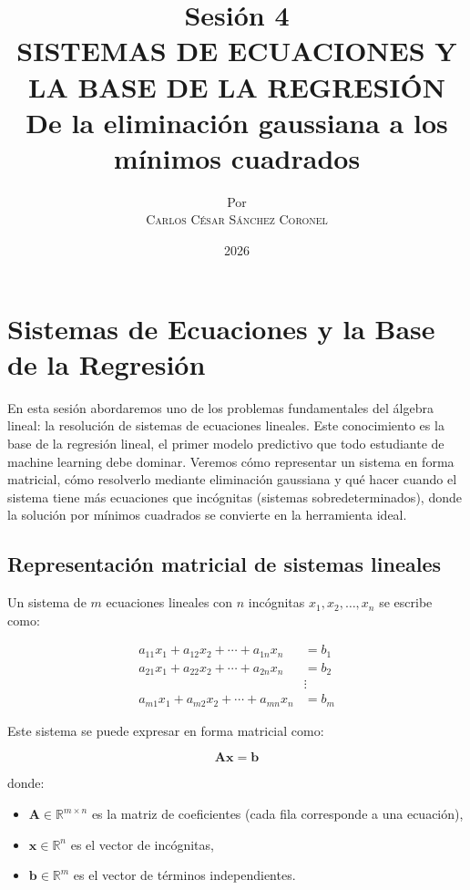 \documentclass[12pt,a4paper,openany,oneside]{book}
\title{
    \textbf{Sesión 4} \\ 
    \Huge \textbf{SISTEMAS DE ECUACIONES Y LA BASE DE LA REGRESIÓN} \\
    \large De la eliminación gaussiana a los mínimos cuadrados \\
}
\author{
    \small Por \\ \vspace{0.2cm}
    \Large \textsc{Carlos César Sánchez Coronel}
}
\date{2026}
\begin{document}
\maketitle
\tableofcontents
{}

\chapter{Sistemas de Ecuaciones y la Base de la Regresión}

En esta sesión abordaremos uno de los problemas fundamentales del álgebra lineal: la resolución de sistemas de ecuaciones lineales. Este conocimiento es la base de la regresión lineal, el primer modelo predictivo que todo estudiante de machine learning debe dominar. Veremos cómo representar un sistema en forma matricial, cómo resolverlo mediante eliminación gaussiana y qué hacer cuando el sistema tiene más ecuaciones que incógnitas (sistemas sobredeterminados), donde la solución por mínimos cuadrados se convierte en la herramienta ideal.

\section{Representación matricial de sistemas lineales}

Un sistema de $m$ ecuaciones lineales con $n$ incógnitas $x_1, x_2, \dots, x_n$ se escribe como:

\begin{align*}
a_{11}x_1 + a_{12}x_2 + \cdots + a_{1n}x_n &= b_1 \\
a_{21}x_1 + a_{22}x_2 + \cdots + a_{2n}x_n &= b_2 \\
&\vdots \\
a_{m1}x_1 + a_{m2}x_2 + \cdots + a_{mn}x_n &= b_m
\end{align*}

Este sistema se puede expresar en forma matricial como:

\begin{equation*}
\mathbf{A}\mathbf{x} = \mathbf{b}
\end{equation*}

donde:
\begin{itemize}
    \item $\mathbf{A} \in \mathbb{R}^{m \times n}$ es la matriz de coeficientes (cada fila corresponde a una ecuación),
    \item $\mathbf{x} \in \mathbb{R}^{n}$ es el vector de incógnitas,
    \item $\mathbf{b} \in \mathbb{R}^{m}$ es el vector de términos independientes.
\end{itemize}
\end{document}
